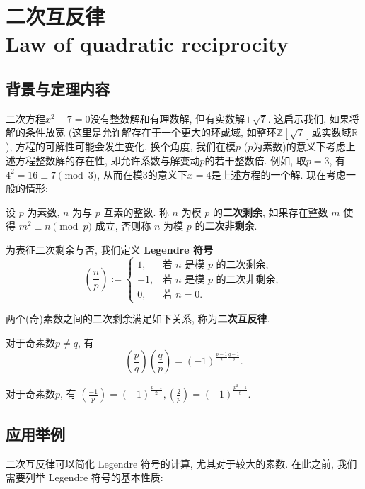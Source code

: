 \documentclass[main]{subfiles}
\newcommand{\mr}{\mathbb{R}}
\newcommand{\mz}{\mathbb{Z}}
\begin{document}
\renewcommand{\filename}{二次互反律}%
\section{二次互反律 \\ Law of quadratic reciprocity}

\subsection{背景与定理内容}

二次方程$x^2-7=0$没有整数解和有理数解, 但有实数解$\pm\sqrt{7}$. 这启示我们, 如果将解的条件放宽 (这里是允许解存在于一个更大的环或域, 如整环$\mz[\sqrt{7}]$或实数域$\mr$), 方程的可解性可能会发生变化. 换个角度, 我们在模$p$ ($p$为素数)的意义下考虑上述方程整数解的存在性, 即允许系数与解变动$p$的若干整数倍. 例如, 取$p=3$, 有$4^2 = 16 \equiv 7 \pmod 3$, 从而在模$3$的意义下$x=4$是上述方程的一个解. 现在考虑一般的情形:

\begin{definition}[二次剩余]
	设 $p$ 为素数, $n$ 为与 $p$ 互素的整数.
	称 $n$ 为模 $p$ 的\textbf{二次剩余},
	如果存在整数 $m$ 使得
	 \(
	m^2 \equiv n \pmod p
	\)
	成立, 否则称 $n$ 为模 $p$ 的\textbf{二次非剩余}.
\end{definition}

为表征二次剩余与否, 我们定义 \textbf{Legendre 符号}
\[
	\left( \frac{n}{p} \right) := \left\{\begin{array}{ll}
		1,  & \mbox{若 $n$ 是模 $p$ 的二次剩余},  \\
		-1, & \mbox{若 $n$ 是模 $p$ 的二次非剩余}, \\
		0,  & \mbox{若 $n=0$}.
	\end{array}\right.
\]

两个(奇)素数之间的二次剩余满足如下关系, 称为\textbf{二次互反律}.

\begin{theorem}[二次互反律]
	对于奇素数$p \neq q$, 有
	\[\left( \frac{p}{q} \right) \left( \frac{q}{p} \right) = (-1)^{\frac{p-1}{2}\frac{q-1}{2}}.\]
\end{theorem}

\begin{theorem}[补充定理]
	对于奇素数$p$, 有 \(\left( \frac{-1}{p} \right) = (-1)^{\frac{p-1}{2}}, \left( \frac{2}{p} \right) = (-1)^{\frac{p^2-1}{8}}.\)
\end{theorem}

\subsection{应用举例}
二次互反律可以简化 Legendre 符号的计算, 尤其对于较大的素数. 在此之前, 我们需要列举 Legendre 符号的基本性质:
\end{document}
